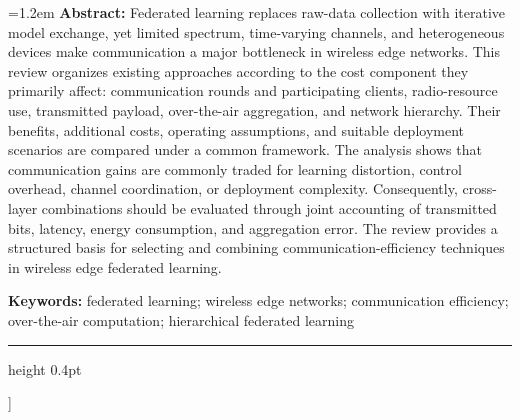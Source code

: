 \documentclass[UTF8,a4paper,twocolumn,zihao=5,fontset=none]{ctexart}
\begin{document}
\begin{@twocolumnfalse}
    \vspace{0.25em}
    \begin{minipage}{\textwidth}
      {\rmfamily\fontsize{9pt}{11pt}\selectfont
      \emergencystretch=1.2em
      \noindent\textbf{Abstract:} Federated learning replaces raw-data collection with iterative model exchange, yet limited spectrum, time-varying channels, and heterogeneous devices make communication a major bottleneck in wireless edge networks. This review organizes existing approaches according to the cost component they primarily affect: communication rounds and participating clients, radio-resource use, transmitted payload, over-the-air aggregation, and network hierarchy. Their benefits, additional costs, operating assumptions, and suitable deployment scenarios are compared under a common framework. The analysis shows that communication gains are commonly traded for learning distortion, control overhead, channel coordination, or deployment complexity. Consequently, cross-layer combinations should be evaluated through joint accounting of transmitted bits, latency, energy consumption, and aggregation error. The review provides a structured basis for selecting and combining communication-efficiency techniques in wireless edge federated learning.

      \noindent\textbf{Keywords:} federated learning; wireless edge networks; communication efficiency; over-the-air computation; hierarchical federated learning}
    \end{minipage}
    \vspace{0.9em}
    \hrule height 0.4pt
    \vspace{0.9em}
  \end{@twocolumnfalse}
]







\FloatBarrier
\printbibliography[heading=bibintoc,title={参考文献}]
\end{document}
